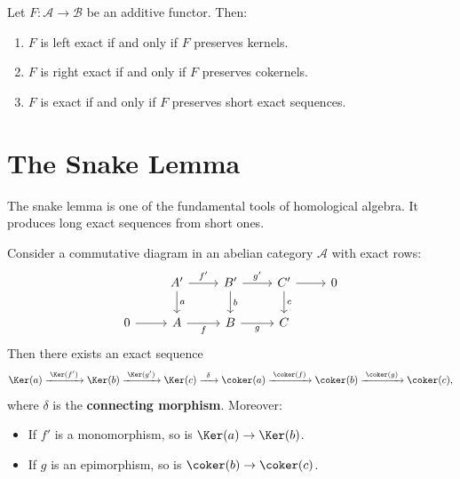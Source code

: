 \begin{proposition}\label{prop:exact-functor-les}
Let $F \colon \mathcal{A} \to \mathcal{B}$ be an additive functor. Then:
\begin{enumerate}
    \item $F$ is left exact if and only if $F$ preserves kernels.
    \item $F$ is right exact if and only if $F$ preserves cokernels.
    \item $F$ is exact if and only if $F$ preserves short exact sequences.
\end{enumerate}
\end{proposition}


\section{The Snake Lemma}\label{sec:snake-lemma}

The snake lemma is one of the fundamental tools of homological algebra. It
produces long exact sequences from short ones.

\begin{theorem}\label{thm:snake-lemma}
Consider a commutative diagram in an abelian category $\mathcal{A}$ with exact rows:
\[
\begin{tikzcd}
    & A' \arrow[r, "f'"] \arrow[d, "a"] & B' \arrow[r, "g'"] \arrow[d, "b"] & C' \arrow[r] \arrow[d, "c"] & 0 \\
    0 \arrow[r] & A \arrow[r, "f"'] & B \arrow[r, "g"'] & C &
\end{tikzcd}
\]
Then there exists an exact sequence
\[
    \Ker(a) \xrightarrow{\;\Ker(f')\;} \Ker(b) \xrightarrow{\;\Ker(g')\;} \Ker(c)
    \xrightarrow{\;\;\delta\;\;} \coker(a) \xrightarrow{\;\coker(f)\;} \coker(b)
    \xrightarrow{\;\coker(g)\;} \coker(c),
\]
where $\delta$ is the \textbf{connecting morphism}.
Moreover:
\begin{itemize}
    \item If $f'$ is a monomorphism, so is $\Ker(a) \to \Ker(b)$.
    \item If $g$ is an epimorphism, so is $\coker(b) \to \coker(c)$.
\end{itemize}
\end{theorem}

